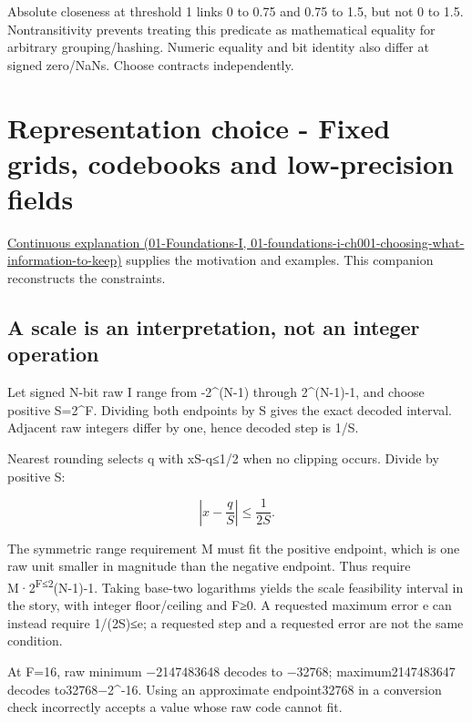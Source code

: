 Absolute closeness at threshold 1 links 0 to 0.75 and 0.75 to 1.5, but not 0 to 1.5. Nontransitivity prevents treating this predicate as mathematical equality for arbitrary grouping/hashing. Numeric equality and bit identity also differ at signed zero/NaNs. Choose contracts independently.

\section{Representation choice - Fixed grids, codebooks and low-precision fields}\label{03-visual-computing-i-ch018-representation-choice---fixed-grids-codebooks-and-low-precision-fields}

\href{../01-Foundations-I/main.pdf\#nameddest=01-foundations-i-ch001-choosing-what-information-to-keep}{Continuous explanation (01-Foundations-I, 01-foundations-i-ch001-choosing-what-information-to-keep)} supplies the motivation and examples. This companion reconstructs the constraints.

\subsection{A scale is an interpretation, not an integer operation}\label{03-visual-computing-i-ch018-a-scale-is-an-interpretation-not-an-integer-operation}

Let signed N-bit raw I range from -2\^{}(N-1) through 2\^{}(N-1)-1, and choose positive S=2\^{}F. Dividing both endpoints by S gives the exact decoded interval. Adjacent raw integers differ by one, hence decoded step is 1/S.

Nearest rounding selects q with \textbar xS-q\textbar≤1/2 when no clipping occurs. Divide by positive S:

\[
\left|x-\frac qS\right|\le\frac1{2S}.
\]

The symmetric range requirement M must fit the positive endpoint, which is one raw unit smaller in magnitude than the negative endpoint. Thus require M·2\textsuperscript{F≤2}(N-1)-1. Taking base-two logarithms yields the scale feasibility interval in the story, with integer floor/ceiling and F≥0. A requested maximum error e can instead require 1/(2S)≤e; a requested step and a requested error are not the same condition.

At F=16, raw minimum −2147483648 decodes to −32768; maximum2147483647 decodes to32768−2\^{}-16. Using an approximate endpoint32768 in a conversion check incorrectly accepts a value whose raw code cannot fit.

